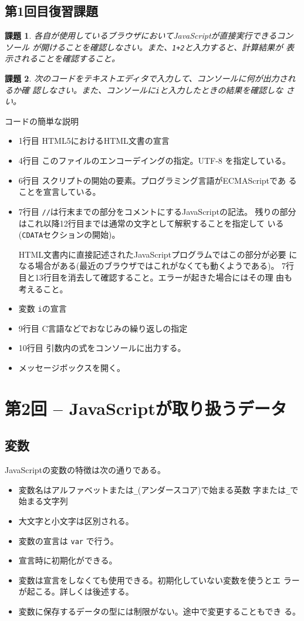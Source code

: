 \documentclass[a4j]{jarticle}
\newcommand{\LIST}[3]{\LISTN{#1}{#2}{#3}{\footnotesize}}
\newcommand{\LISTN}[4]{%
\renewcommand{\theFancyVerbLine}{#4\arabic{FancyVerbLine}}
\VerbatimInput[numbers=left,fontsize=#4,
numbersep=1pt,firstline=#2,lastline=#3]{#1} 
}
\newtheorem{Prob}{課題}[section]
\begin{document}
\subsection{第1回目復習課題}
\begin{Prob}\upshape
 各自が使用しているブラウザにおいてJavaScriptが直接実行できるコンソール
 が開けることを確認しなさい。また、\texttt{1+2}と入力すると、計算結果が
 表示されることを確認すること。
\end{Prob}
\begin{Prob}\label{FisatJS}
 次のコードをテキストエディタで入力して、コンソールに何が出力されるか確
 認しなさい。また、コンソールに\texttt{i}と入力したときの結果を確認しな
 さい。
\LIST{a.html}{1}{last}
\end{Prob}
コードの簡単な説明
\begin{itemize}
 \item 1行目 HTML5におけるHTML文書の宣言
 \item 4行目 このファイルのエンコーデイングの指定。UTF-8 を指定している。
 \item 6行目 スクリプトの開始の要素。プログラミング言語がECMAScriptであ
       ることを宣言している。
 \item 7行目 \texttt{//}は行末までの部分をコメントにするJavaScriptの記法。
残りの部分はこれ以降12行目までは通常の文字として解釈することを指定して
       いる(\texttt{CDATA}セクションの開始)。

       HTML文書内に直接記述されたJavaScriptプログラムではこの部分が必要
       になる場合がある(最近のブラウザではこれがなくても動くようである)。
       7行目と13行目を消去して確認すること。エラーが起きた場合にはその理
       由も考えること。
 \item 変数 \texttt{i}の宣言
 \item 9行目 C言語などでおなじみの繰り返しの指定
 \item 10行目 引数内の式をコンソールに出力する。
 \item メッセージボックスを開く。
\end{itemize}
\newpage
\section{第2回 -- JavaScriptが取り扱うデータ}
\subsection{変数}
JavaScriptの変数の特徴は次の通りである。
\begin{itemize}
 \item 変数名はアルファベットまたは\verb+_+(アンダースコア)で始まる英数
       字または\verb+_+で始まる文字列
 \item 大文字と小文字は区別される。
 \item 変数の宣言は \texttt{var} で行う。
 \item 宣言時に初期化ができる。
 \item 変数は宣言をしなくても使用できる。初期化していない変数を使うとエ
       ラーが起こる。詳しくは後述する。
 \item 変数に保存するデータの型には制限がない。途中で変更することもでき
       る。
\end{itemize}
\end{document}
